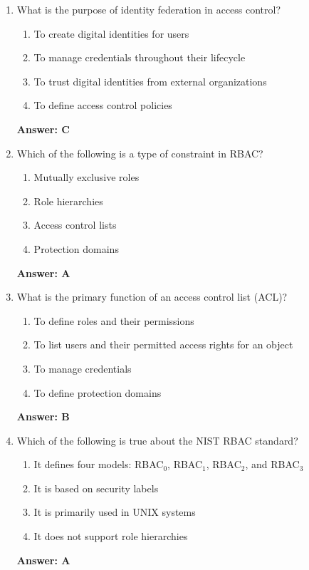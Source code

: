 \documentclass{article}
\begin{document}
\begin{enumerate}
    \item What is the purpose of identity federation in access control?
    \begin{enumerate}[label=\Alph*)]
        \item To create digital identities for users
        \item To manage credentials throughout their lifecycle
        \item To trust digital identities from external organizations
        \item To define access control policies
    \end{enumerate}
    \textbf{Answer: C}

    \item Which of the following is a type of constraint in RBAC?
    \begin{enumerate}[label=\Alph*)]
        \item Mutually exclusive roles
        \item Role hierarchies
        \item Access control lists
        \item Protection domains
    \end{enumerate}
    \textbf{Answer: A}

    \item What is the primary function of an access control list (ACL)?
    \begin{enumerate}[label=\Alph*)]
        \item To define roles and their permissions
        \item To list users and their permitted access rights for an object
        \item To manage credentials
        \item To define protection domains
    \end{enumerate}
    \textbf{Answer: B}

    \item Which of the following is true about the NIST RBAC standard?
    \begin{enumerate}[label=\Alph*)]
        \item It defines four models: RBAC$_0$, RBAC$_1$, RBAC$_2$, and RBAC$_3$
        \item It is based on security labels
        \item It is primarily used in UNIX systems
        \item It does not support role hierarchies
    \end{enumerate}
    \textbf{Answer: A}


\end{enumerate}
\end{document}
